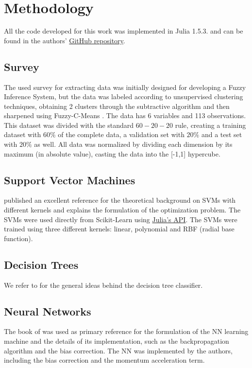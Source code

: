 \documentclass[conference]{IEEEtran}
\theoremstyle{definition}
\theoremstyle{remark}
\theoremstyle{remark}
\begin{document}
\section{Methodology}\label{sec:meth}
All the code developed for this work was implemented in Julia 1.5.3. and
can be found in the authors'
\href{https://github.com/juanscr/ai-works}{GitHub repository}.

\subsection{Survey}
The used survey for extracting data was initially designed for developing
a Fuzzy Inference System, but the data was labeled according to
unsupervised clustering techniques, obtaining 2 clusters through the subtractive
algorithm \parencite{chiu1994} and then sharpened using Fuzzy-C-Means
\parencite{dunn1973}. The data has 6 variables and 113 observations. This
dataset was divided with the standard $60-20-20$ rule, creating a training
dataset with $60\%$ of the complete data, a validation set with $20\%$ and a
test set with $20\%$ as well. All data was normalized by dividing each dimension
by its maximum (in absolute value), casting the data into the [-1,1] hypercube.

\subsection{Support Vector Machines}
\textcite{burges1998} published an excellent reference for the theoretical
background on SVMs with different kernels and explains the formulation of the
optimization problem. The SVMs were used directly from Scikit-Learn
\parencite{scikit-learn, sklearn_api} using
\href{https://bit.ly/3lDHADX}{Julia's API}. The SVMs were trained using three
different kernels: linear, polynomial and RBF (radial base function).

\subsection{Decision Trees}
We refer to \textcite{bramer2007} for the general ideas behind the decision tree
classifier.

\subsection{Neural Networks}
The book of \textcite{aggarwal2018} was used as primary reference for the
formulation of the NN learning machine and the details of its implementation,
such as the backpropagation algorithm and the bias correction.
The NN was implemented by the authors, including the bias correction and the
momentum acceleration term.
\end{document}
